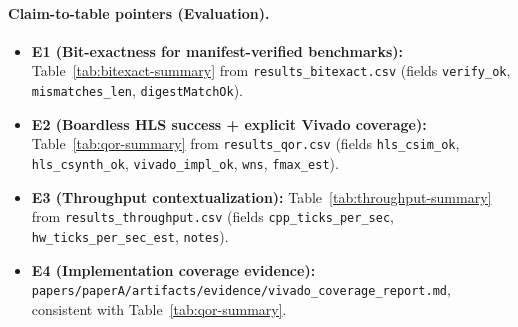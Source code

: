 \paragraph{Claim-to-table pointers (Evaluation).}
\begin{itemize}
\item \textbf{E1 (Bit-exactness for manifest-verified benchmarks):} Table~\ref{tab:bitexact-summary} from \texttt{results\_bitexact.csv} (fields \texttt{verify\_ok}, \texttt{mismatches\_len}, \texttt{digestMatchOk}).
\item \textbf{E2 (Boardless HLS success + explicit Vivado coverage):} Table~\ref{tab:qor-summary} from \texttt{results\_qor.csv} (fields \texttt{hls\_csim\_ok}, \texttt{hls\_csynth\_ok}, \texttt{vivado\_impl\_ok}, \texttt{wns}, \texttt{fmax\_est}).
\item \textbf{E3 (Throughput contextualization):} Table~\ref{tab:throughput-summary} from \texttt{results\_throughput.csv} (fields \texttt{cpp\_ticks\_per\_sec}, \texttt{hw\_ticks\_per\_sec\_est}, \texttt{notes}).
\item \textbf{E4 (Implementation coverage evidence):} \texttt{papers/paperA/artifacts/evidence/vivado\_coverage\_report.md}, consistent with Table~\ref{tab:qor-summary}.
\end{itemize}
